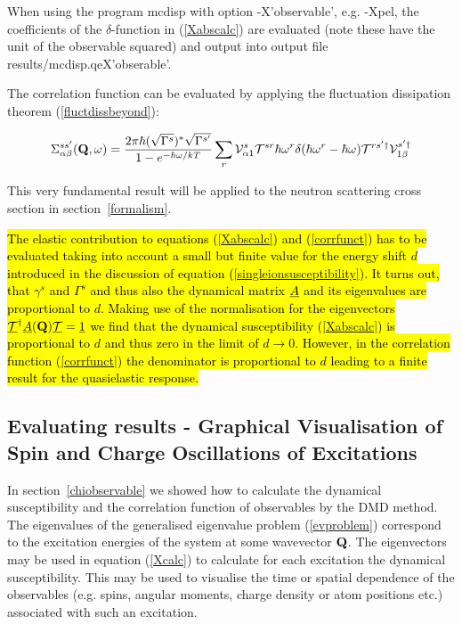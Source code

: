 When using the program {\prg mcdisp} with option {\prg -X'observable'}, e.g. {\prg -Xpel}, 
the coefficients of the $\delta$-function in (\ref{Xabscalc}) are evaluated (note these
have the unit of the observable squared) and output into output file {\prg results/mcdisp.qeX'obserable'}.

\noindent  The correlation function \hili{$\M{\m{\Sigma}}$} can be evaluated by applying the 
fluctuation dissipation theorem (\ref{fluctdissbeyond}):

\begin{equation}\label{corrfunct}
{\Sigma^{ss'}_{\alpha\beta}({\mathbf Q},\omega)= 
\frac{2 \pi \hbar(\sqrt{\Gamma^s})^\ast\sqrt{\Gamma^{s'}}}
{1-e^{-\hbar\omega/kT}}
\sum_r
\mathcal V^s_{\alpha1} \mathcal T^{sr} \hbar \omega^r 
\delta(\hbar \omega^r
- \hbar \omega) \mathcal T^{rs'\dag} \mathcal V^{s'\dag}_{1\beta}}
\end{equation}

This very fundamental result will be applied to the neutron scattering cross section
in section~\ref{formalism}.

\hl{
The elastic contribution to equations (\ref{Xabscalc}) and
(\ref{corrfunct}) has to be evaluated taking into account
a small but finite value for the energy shift $d$ introduced
in the discussion of equation (\ref{singleionsusceptibility}). It turns
out, that $\gamma^s$ and $\Gamma^s$ and thus also
the dynamical matrix $\underline{A}$ and its eigenvalues
are proportional to $d$. Making use of the normalisation 
for the eigenvectors
$\underline{\mathcal T}^\dag \underline{A}(\mathbf Q)\underline{\mathcal T}=\underline{1}$
we find that the dynamical susceptibility (\ref{Xabscalc})
is proportional to $d$ and thus zero in the limit of
$d \rightarrow 0$. However, in the  correlation function
(\ref{corrfunct}) the denominator is proportional to
$d$ leading to a finite result for the quasielastic response.
}

\subsection{Evaluating results - Graphical Visualisation of Spin and Charge Oscillations of %
Excitations}\label{visualization}

In section~\ref{chiobservable} we showed how to calculate the dynamical susceptibility and
the correlation function of observables by the DMD method. The eigenvalues of the generalised
eigenvalue problem (\ref{evproblem}) correspond to the excitation energies of the system at some wavevector ${\bf Q}$.
The eigenvectors may be used in equation (\ref{Xcalc}) to calculate for each excitation
the dynamical susceptibility.
This may be used to visualise the time or spatial dependence
of the observables (e.g. spins, angular moments, 
 charge density or atom positions etc.)
associated with such an excitation.

